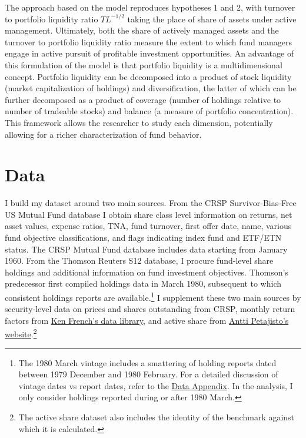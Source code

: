 \documentclass[openany]{book}
\let\rmarkdownfootnote\footnote%
\def\footnote{\protect\rmarkdownfootnote}
\theoremstyle{definition}
\theoremstyle{definition}
\theoremstyle{definition}
\theoremstyle{remark}
\begin{document}
The approach based on the \citet{pst17L} model reproduces hypotheses 1
and 2, with turnover to portfolio liquidity ratio \(TL^{-1/2}\) taking
the place of share of assets under active management. Ultimately, both
the share of actively managed assets and the turnover to portfolio
liquidity ratio measure the extent to which fund managers engage in
active pursuit of profitable investment opportunities. An advantage of
this formulation of the model is that portfolio liquidity is a
multidimensional concept. Portfolio liquidity can be decomposed into a
product of stock liquidity (market capitalization of holdings) and
diversification, the latter of which can be further decomposed as a
product of coverage (number of holdings relative to number of tradeable
stocks) and balance (a measure of portfolio concentration). This
framework allows the researcher to study each dimension, potentially
allowing for a richer characterization of fund behavior.

\hypertarget{sec:Data}{%
\chapter{Data}\label{sec:Data}}

I build my dataset around two main sources. From the CRSP
Survivor-Bias-Free US Mutual Fund database I obtain share class level
information on returns, net asset values, expense ratios, TNA, fund
turnover, first offer date, name, various fund objective
classifications, and flags indicating index fund and ETF/ETN status. The
CRSP Mutual Fund database includes data starting from January 1960. From
the Thomson Reuters S12 database, I procure fund-level share holdings
and additional information on fund investment objectives. Thomson's
predecessor first compiled holdings data in March 1980, subsequent to
which consistent holdings reports are available.\footnote{The 1980 March
  vintage includes a smattering of holding reports dated between 1979
  December and 1980 February. For a detailed discussion of vintage dates
  vs report dates, refer to the
  \href{https://www.dropbox.com/s/qugvhb8b0wqp0cg/LJ_JMP_Data_Appendix.pdf?dl=0}{Data
  Appendix}. In the analysis, I only consider holdings reported during
  or after 1980 March.} I supplement these two main sources by
security-level data on prices and shares outstanding from CRSP, monthly
return factors from
\href{http://mba.tuck.dartmouth.edu/pages/faculty/ken.french/data_library.html}{Ken
French's data library}, and active share \citep{cp09, petajisto13} from
\href{http://www.petajisto.net/data.html}{Antti Petajisto's
website}.\footnote{The active share dataset also includes the identity
  of the benchmark against which it is calculated.}
\end{document}
